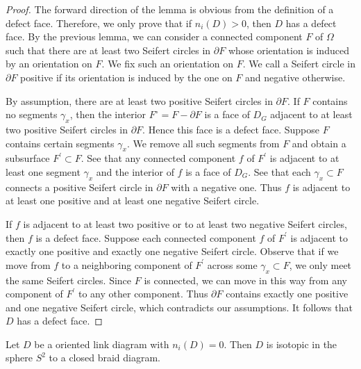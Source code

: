 \begin{proof}
  The forward direction of the lemma is obvious from the definition of a defect face. Therefore, we only prove that if $n_i(D) > 0$, then $D$ has a defect face. By the previous lemma, we can consider a connected component $F$ of $\Omega$ such that there are at least two Seifert circles in $\partial F$ whose orientation is induced by an orientation on $F$. We fix such an orientation on $F$. We call a Seifert circle in $\partial F$ positive if its orientation is induced by the one on $F$ and negative otherwise.

  By assumption, there are at least two positive Seifert circles in $\partial F$. If $F$ contains no segments $\gamma_x$, then the interior $F^{\circ} = F - \partial F$ is a face of $D_G$ adjacent to at least two positive Seifert circles in $\partial F$. Hence this face is a defect face. Suppose $F$ contains certain segments $\gamma_x$. We remove all such segments from $F$ and obtain a subsurface $F^{\prime}\subset F$. See that any connected component $f$ of $F^{\prime}$ is adjacent to at least one segment $\gamma_x$ and the interior of $f$ is a face of $D_G$. See that each $\gamma_x \subset F$ connects a positive Seifert circle in $\partial F$ with a negative one. Thus $f$ is adjacent to at least one positive and at least one negative Seifert circle.

  If $f$ is adjacent to at least two positive or to at least two negative Seifert circles, then $f$ is a defect face. Suppose each connected component $f$ of $F^{\prime}$ is adjacent to exactly one positive and exactly one negative Seifert circle. Observe that if we move from $f$ to a neighboring component of $F^{\prime}$ across some $\gamma_x\subset F$, we only meet the same Seifert circles. Since $F$ is connected, we can move in this way from any component of $F^{\prime}$ to any other component. Thus $\partial F$ contains exactly one positive and one negative Seifert circle, which contradicts our assumptions. It follows that $D$ has a defect face.
\end{proof}

\begin{lemma}
  \label{l3}
  Let $D$ be a oriented link diagram with $n_i(D) = 0$. Then $D$ is isotopic in the sphere $S^2$ to a closed braid diagram.
\end{lemma}

